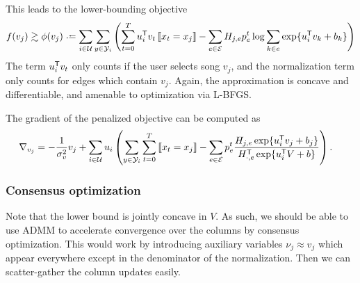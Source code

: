 \documentclass{article}
\def\E{\ensuremath{\mathcal{E}}}
\def\U{\ensuremath{\mathcal{U}}}
\begin{document}
This leads to the lower-bounding objective 
\begin{equation}
f(v_j) \gtrsim \phi(v_j) \defeq \sum_{i \in \U} \sum_{y \in \Y_i} \left(\sum_{t=0}^T u_i\trans v_t \ind{x_t = x_j} - \sum_{e \in \E} H_{j,e} p_e^t \log \sum_{k\in e} \exp\{u_i\trans v_k + b_k\} \right)
\end{equation}
The term $u_i^\mathsf{T} v_t$ only counts if the user selects song $v_j$, and the normalization term only counts for edges which contain $v_j$.  Again, the approximation is concave and
differentiable, and amenable to optimization via L-BFGS.

The gradient of the penalized objective can be computed as 
\begin{align}
\nabla_{v_j} &= -\frac{1}{\sigma_v^2} v_j + \sum_{i \in \U}u_i \left(\sum_{y \in \Y_i} \sum_{t=0}^T \ind{x_t=x_j} - \sum_{e \in \E} p_e^t \frac{H_{j,e} \exp\{u_i\trans v_j +
b_j\}}{H_{\cdot,e}\trans \exp\{u_i\trans V + b\}}\right).
\end{align}

\subsubsection{Consensus optimization}
Note that the lower bound is jointly concave in $V$. As such, we should be able to use ADMM to accelerate convergence over the columns by consensus optimization.  This would work by
introducing auxiliary variables $\nu_j \approx v_j$ which appear everywhere except in the denominator of the normalization.  Then we can scatter-gather the column updates easily.

\end{document}
